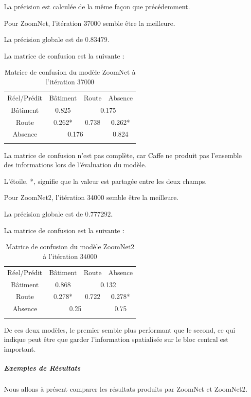 \documentclass[a4paper, 11pt]{report}
\begin{document}
La précision est calculée de la même façon que précédemment.

Pour ZoomNet, l'itération 37000 semble être la meilleure.

La précision globale est de $0.83479$.

La matrice de confusion est la suivante :
\begin{table}[H]
	\centering
	\begin{tabularx}{0.5\textwidth}{c|c c c|}
		Réel/Prédit & Bâtiment & Route & Absence \\
		\hhline{----}
		Bâtiment & 0.825 \cellcolor[gray]{.8} & \multicolumn{2}{c|}{0.175} \\
		Route & 0.262* & 0.738 \cellcolor[gray]{.8} & 0.262*\\
		Absence & \multicolumn{2}{c}{0.176} & 0.824 \cellcolor[gray]{.8}\\
		\hhline{~---}
	\end{tabularx}
	\caption{Matrice de confusion du modèle ZoomNet à l'itération 37000}
\end{table}

La matrice de confusion n'est pas complète, car Caffe ne produit pas l'ensemble des informations lors de l'évaluation du modèle.

L'étoile, *, signifie que la valeur est partagée entre les deux champs.

Pour ZoomNet2, l'itération 34000 semble être la meilleure.

La précision globale est de $0.777292$.

La matrice de confusion est la suivante :
\begin{table}[H]
	\centering
	\begin{tabularx}{0.5\textwidth}{c|c c c|}
		Réel/Prédit & Bâtiment & Route & Absence \\
		\hhline{----}
		Bâtiment & 0.868 \cellcolor[gray]{.8} & \multicolumn{2}{c|}{0.132} \\
		Route & 0.278* & 0.722 \cellcolor[gray]{.8} & 0.278*\\
		Absence & \multicolumn{2}{c}{0.25} & 0.75 \cellcolor[gray]{.8}\\
		\hhline{~---}
	\end{tabularx}
	\caption{Matrice de confusion du modèle ZoomNet2 à l'itération 34000}
\end{table}

De ces deux modèles, le premier semble plus performant que le second, ce qui indique peut être que garder l'information spatialisée sur le bloc central est important.
\subparagraph{Exemples de Résultats}
Nous allons à présent comparer les résultats produits par ZoomNet et ZoomNet2.
\end{document}
